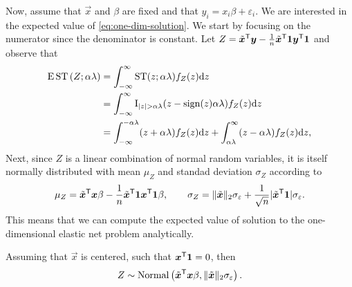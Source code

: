Now, assume that \(\vec{x}\) and \(\beta\) are fixed and that \(y_i = x_i\beta + \varepsilon_i\). We are interested in the expected value of \eqref{eq:one-dim-solution}. We start by focusing on the numerator since the denominator is constant. Let \(Z = \tilde{\vec{x}}^\T \vec{y} - \frac{1}{n} \tilde{\vec{x}}^\T \ones \vec{y}^\T \ones\) and observe that
\[
  \begin{aligned}
    \operatorname{\text{E}} \operatorname{ST}{\left(Z; \alpha\lambda \right)} & = \int_{-\infty}^\infty \operatorname{ST}(z; \alpha\lambda) f_Z(z) \mathrm{d} z                                                                      \\
                                           & = \int_{-\infty}^\infty \operatorname{I}_{|z| > \alpha\lambda} (z -\operatorname{sign}(z)\alpha\lambda) f_Z(z) \mathrm{d} z                                       \\
                                           & = \int_{-\infty}^{-\alpha\lambda}(z + \alpha\lambda)f_Z(z) \mathrm{d} z + \int_{\alpha\lambda}^\infty (z - \alpha\lambda)f_Z(z) \mathrm{d} z,
  \end{aligned}
\]
Next, since \(Z\) is a linear combination of normal random variables, it is itself normally distributed with mean \(\mu_Z\) and standad deviation \(\sigma_Z\) according to
\[
  \mu_Z = \tilde{\vec{x}}^\T\vec{x} \beta - \frac{1}{n} \tilde{\vec{x}}^\T\ones \vec{x}^\T\ones  \beta,
  \qquad
  \sigma_Z = \lVert \tilde{\vec{x}}\rVert_2 \sigma_\varepsilon + \frac{1}{\sqrt{n}}|\tilde{\vec{x}}^\T \ones| \sigma_\varepsilon.
\]
This means that we can compute the expected value of solution to the one-dimensional elastic net problem analytically.


Assuming that \(\vec{x}\) is centered, such that \(\vec{x}^\T \ones = 0\), then
\[
  Z \sim \normal\left(\tilde{\vec{x}}^\T\vec{x} \beta, \lVert \tilde{\vec{x}}\rVert_2 \sigma_\varepsilon\right).
\]


